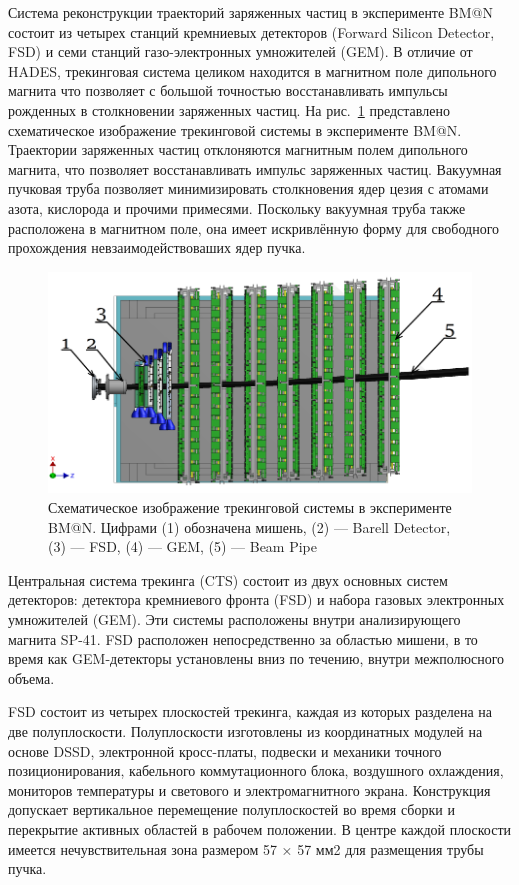 Система реконструкции траекторий заряженных частиц в эксперименте BM@N состоит из четырех станций кремниевых детекторов (Forward Silicon Detector, FSD) и семи станций газо-электронных умножителей (GEM). 
В отличие от HADES, трекинговая система целиком находится в магнитном поле дипольного магнита что позволяет с большой точностью восстанавливать импульсы рожденных в столкновении заряженных частиц.
На рис.~\ref{fig:bmn_tracking} представлено схематическое изображение трекинговой системы в эксперименте BM@N.
Траектории заряженных частиц отклоняются магнитным полем дипольного магнита, что позволяет восстанавливать импульс заряженных частиц.
Вакуумная пучковая труба позволяет минимизировать столкновения ядер цезия с атомами азота, кислорода и прочими примесями.
Поскольку вакуумная труба также расположена в магнитном поле, она имеет искривлённую форму для свободного прохождения невзаимодействоваших ядер пучка.  
%
\begin{figure}[ht]
\begin{center}
    \includegraphics[width=0.75\linewidth]{images/bmn_tracking_system.png}
    \caption{Схематическое изображение трекинговой системы в эксперименте BM@N. Цифрами (1) обозначена мишень,
    (2) --- Barell Detector, (3) --- FSD, (4) --- GEM, (5) --- Beam Pipe }
    \label{fig:bmn_tracking}
\end{center}
\end{figure}

Центральная система трекинга (CTS) состоит из двух основных систем детекторов: детектора кремниевого фронта (FSD) и набора газовых электронных умножителей (GEM). 
Эти системы расположены внутри анализирующего магнита SP-41. 
FSD расположен непосредственно за областью мишени, в то время как GEM-детекторы установлены вниз по течению, внутри межполюсного объема.

FSD состоит из четырех плоскостей трекинга, каждая из которых разделена на две полуплоскости. 
Полуплоскости изготовлены из координатных модулей на основе DSSD, электронной кросс-платы, подвески и механики точного позиционирования, кабельного коммутационного блока, воздушного охлаждения, мониторов температуры и светового и электромагнитного экрана. 
Конструкция допускает вертикальное перемещение полуплоскостей во время сборки и перекрытие активных областей в рабочем положении. 
В центре каждой плоскости имеется нечувствительная зона размером 57 × 57 мм2 для размещения трубы пучка.

